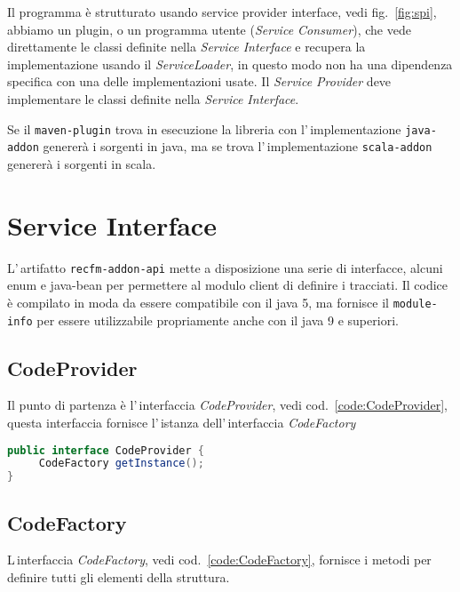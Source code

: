 \documentclass[a4paper,10pt]{report}
\begin{document}
Il programma è strutturato usando service provider interface, 
vedi fig.~\ref{fig:spi}, abbiamo un plugin, o un programma utente 
(\textsl{Service Consumer}), che vede direttamente le classi definite nella 
\textsl{Service Interface} e recupera la implementazione usando il 
\textsl{ServiceLoader}, in questo modo non ha una dipendenza specifica con una
delle implementazioni usate. 
Il \textsl{Service Provider} deve implementare le classi definite nella 
\textsl{Service Interface}.

Se il \verb!maven-plugin! trova in esecuzione la libreria con 
l'\,implementazione \verb!java-addon! genererà i sorgenti in java, ma se trova
l'\,implementazione \verb!scala-addon! genererà i sorgenti in scala.

\chapter{Service Interface}
L'\,artifatto \verb!recfm-addon-api! mette a disposizione una serie di 
interfacce, alcuni enum e java-bean per permettere al modulo client di definire
i tracciati. 
Il codice è compilato in moda da essere compatibile con il java 5, ma fornisce
il \verb!module-info! per essere utilizzabile propriamente anche con il java 9
e superiori.

\section{CodeProvider}
Il punto di partenza è l'\,interfaccia \textsl{CodeProvider}, vedi 
cod.~\ref{code:CodeProvider}, questa interfaccia fornisce l'\,istanza 
dell'\,interfaccia \textsl{CodeFactory}

\begin{figure*}[!htb]
\begin{lstlisting}[language=java, caption=interfaccia CodeProvider, 
label=code:CodeProvider]
public interface CodeProvider {
     CodeFactory getInstance();
}
\end{lstlisting}
\end{figure*}


\section{CodeFactory} 
L\,interfaccia \textsl{CodeFactory}, vedi cod.~\ref{code:CodeFactory}, fornisce i 
metodi per definire tutti gli elementi della struttura.
\end{document}
